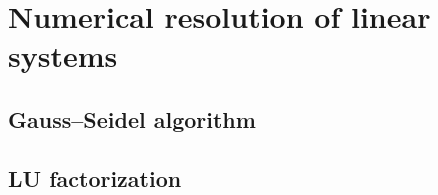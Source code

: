 
\section{Numerical resolution of linear systems}

\subsection{Gauss--Seidel algorithm}

\subsection{LU factorization}